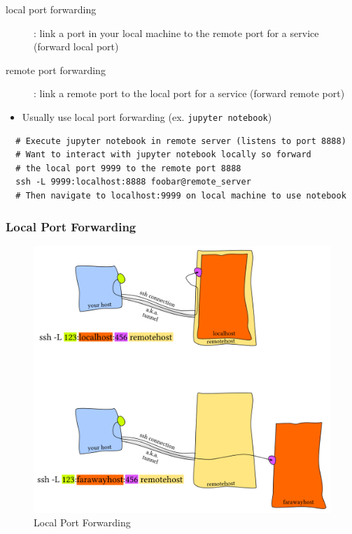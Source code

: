 \documentclass[letterpaper,12pt]{article}
\begin{document}
\begin{description}
  \item[local port forwarding]: link a port in your local machine to the remote port for a service (forward local port)
  \item[remote port forwarding]: link a remote port to the local port for a service (forward remote port)
\end{description}

\begin{itemize}
  \item Usually use local port forwarding (ex. \lstinline{jupyter notebook})
\end{itemize}

\begin{lstlisting}
  # Execute jupyter notebook in remote server (listens to port 8888)
  # Want to interact with jupyter notebook locally so forward
  # the local port 9999 to the remote port 8888
  ssh -L 9999:localhost:8888 foobar@remote_server
  # Then navigate to localhost:9999 on local machine to use notebook
\end{lstlisting}

\subsubsection{Local Port Forwarding}

\begin{figure}[H]
  \includegraphics[width=160mm, scale=0.75]{pictures/local-port-forwarding.png}
  \caption{Local Port Forwarding}
\end{figure}
\end{document}
